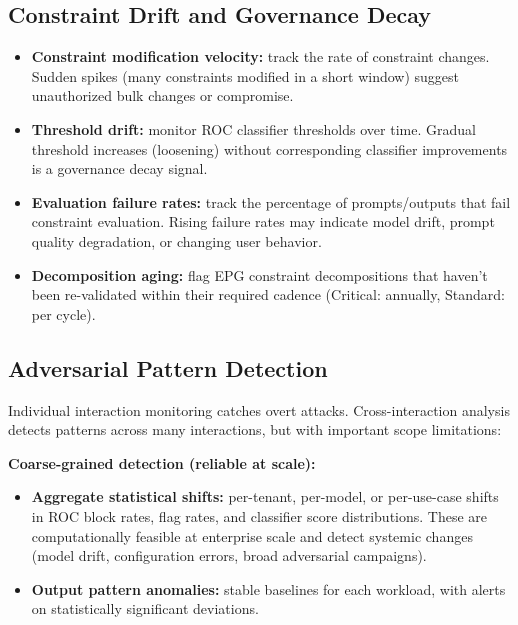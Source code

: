 \subsection{Constraint Drift and Governance Decay}


\begin{itemize}
  \item \textbf{Constraint modification velocity:} track the rate of constraint changes. Sudden spikes (many constraints modified in a short window) suggest unauthorized bulk changes or compromise.
  \item \textbf{Threshold drift:} monitor ROC classifier thresholds over time. Gradual threshold increases (loosening) without corresponding classifier improvements is a governance decay signal.
  \item \textbf{Evaluation failure rates:} track the percentage of prompts/outputs that fail constraint evaluation. Rising failure rates may indicate model drift, prompt quality degradation, or changing user behavior.
  \item \textbf{Decomposition aging:} flag EPG constraint decompositions that haven't been re-validated within their required cadence (Critical: annually, Standard: per cycle).
\end{itemize}


\subsection{Adversarial Pattern Detection}


Individual interaction monitoring catches overt attacks. Cross-interaction analysis detects patterns across many interactions, but with important scope limitations:

\textbf{Coarse-grained detection (reliable at scale):}
\begin{itemize}
  \item \textbf{Aggregate statistical shifts:} per-tenant, per-model, or per-use-case shifts in ROC block rates, flag rates, and classifier score distributions. These are computationally feasible at enterprise scale and detect systemic changes (model drift, configuration errors, broad adversarial campaigns).
  \item \textbf{Output pattern anomalies:} stable baselines for each workload, with alerts on statistically significant deviations.
\end{itemize}


